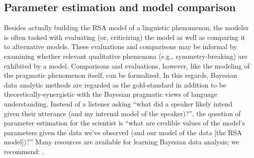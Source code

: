 \documentclass{sp}
\newcommand{\gcs}[1]{\textcolor{blue}{[gcs: #1]}}
\newcommand{\mht}[1]{\textcolor{purple}{[mht: #1]}}
\begin{document}




\subsection{Parameter estimation and model comparison}

Besides actually building the RSA model of a linguistic phenomenon, the modeler is often tasked with evaluating (or, criticizing) the model as well as comparing it to alternative models.
These evaluations and comparisons may be informal by examining whether relevant qualitative phemenona (e.g., symmetry-breaking) are exhibited by a model.
Comparisons and evaluations, however, like the modeling of the pragmatic phenomenon itself, can be formalized. 
In this regards, Bayesian data analytic methods are regarded as the gold-standard in addition to be theoretically-synergistic with the Bayesian pragmatic views of language understanding.
Instead of a listener asking ``what did a speaker likely intend given their utterance (and my internal model of the speaker)?'', the question of parameter estimation for the scientist is ``what are credible values of the model's parameters given the data we've observed (and our model of the data [the RSA model])?''
Many resources are available for learning Bayesian data analysis; we recommend: \cite{gelman2013bayesian, kruschke2014doing, lee2014bayesian,Lambert2018:A-Students-Guid}.
\end{document}
